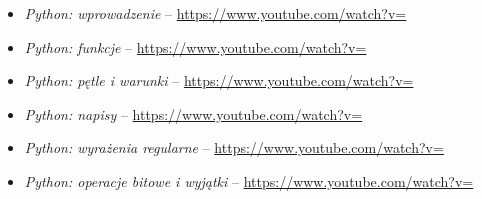 % 
% 
% 
% 

\begin{itemize}
\item \emph{Python: wprowadzenie} – \url{https://www.youtube.com/watch?v=}
\item \emph{Python: funkcje} – \url{https://www.youtube.com/watch?v=}
\item \emph{Python: pętle i warunki} – \url{https://www.youtube.com/watch?v=}
\item \emph{Python: napisy} – \url{https://www.youtube.com/watch?v=}
\item \emph{Python: wyrażenia regularne} – \url{https://www.youtube.com/watch?v=}
\item \emph{Python: operacje bitowe i wyjątki} – \url{https://www.youtube.com/watch?v=}
\end{itemize}
